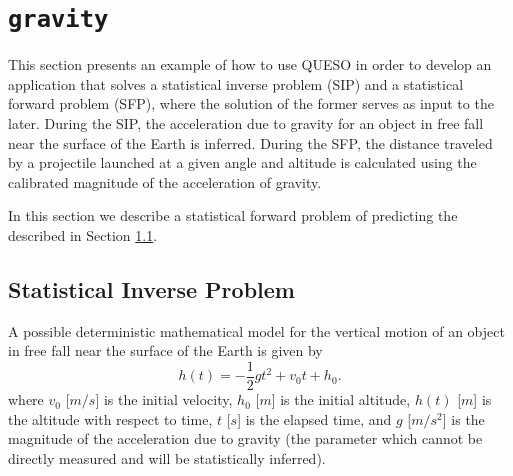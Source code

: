 
\section{\texttt{gravity}}\label{sec:example_gravity}

This section presents an example of how to use QUESO in order to develop an application that solves a 
statistical inverse problem (SIP) and a statistical forward problem (SFP), where the solution of the former 
serves as input to the later. During the SIP, the acceleration due to gravity for an object in free 
fall near the surface of the Earth is inferred. During the SFP, the distance traveled by a projectile 
launched at a given angle and altitude is calculated using the calibrated magnitude of the acceleration of gravity.


In this section we describe a statistical forward problem  of predicting the described in Section 
\ref{sec:gravity-ip}.

\subsection{Statistical Inverse Problem}\label{sec:gravity-ip}



A possible deterministic mathematical model for the vertical motion of an object in free fall near the 
surface of the Earth is given by
\begin{equation}\label{eq:gravity01}
h(t)=-\frac{1}{2} g t^2 + v_0 t + h_0.
\end{equation}
where
$v_0$ [$m/s$] is the initial velocity,
$h_0$ [$m$] is the initial altitude,
$h(t)$ [$m$] is the altitude with respect to time,
$t$ [$s$] is the elapsed time, and
$g$ [$m/s^2$] is the magnitude of the acceleration due to gravity 
(the parameter which cannot be directly measured and will be statistically inferred).



